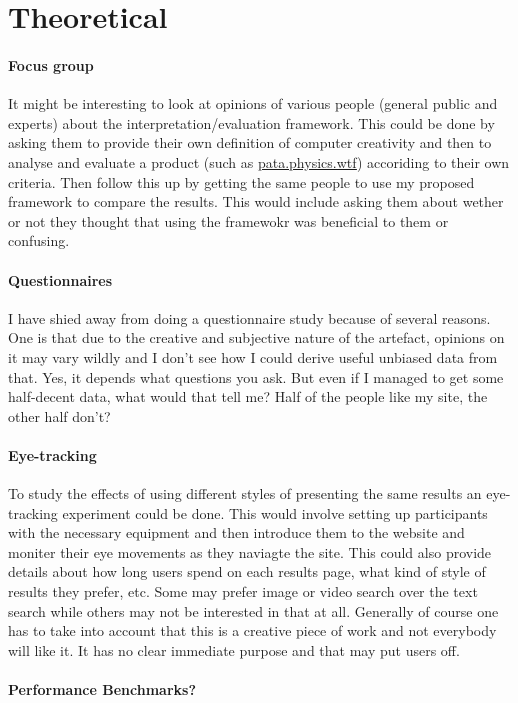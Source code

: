 \section{Theoretical}

\paragraph{Focus group}
It might be interesting to look at opinions of various people (general public and experts) about the interpretation/evaluation framework. This could be done by asking them to provide their own definition of computer creativity and then to analyse and evaluate a product (such as \url{pata.physics.wtf}) accoriding to their own criteria. Then follow this up by getting the same people to use my proposed framework to compare the results. This would include asking them about wether or not they thought that using the framewokr was beneficial to them or confusing.

\paragraph{Questionnaires}
I have shied away from doing a questionnaire study because of several reasons. One is that due to the creative and subjective nature of the artefact, opinions on it may vary wildly and I don't see how I could derive useful unbiased data from that. Yes, it depends what questions you ask. But even if I managed to get some half-decent data, what would that tell me? Half of the people like my site, the other half don't?


\paragraph{Eye-tracking}
To study the effects of using different styles of presenting the same results an eye-tracking experiment could be done. This would involve setting up participants with the necessary equipment and then introduce them to the website and moniter their eye movements as they naviagte the site. This could also provide details about how long users spend on each results page, what kind of style of results they prefer, etc. Some may prefer image or video search over the text search while others may not be interested in that at all. Generally of course one has to take into account that this is a creative piece of work and not everybody will like it. It has no clear immediate purpose and that may put users off.

\paragraph{Performance Benchmarks?}


\stopcontents[chapters]

